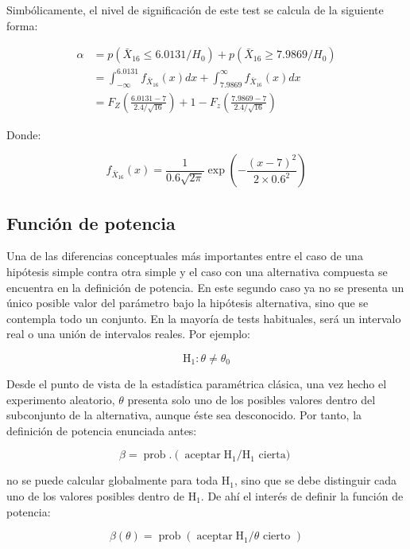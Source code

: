 \documentclass[
]{article}
\begin{document}
Simbólicamente, el nivel de significación de este test se calcula de la siguiente forma:

\[
\begin{aligned}
\alpha & =p\left(\bar{X}_{16} \leq 6.0131 / H_{0}\right)+p\left(\bar{X}_{16} \geq 7.9869 / H_{0}\right) \\
& =\int_{-\infty}^{6.0131} f_{\bar{X}_{16}}(x) d x+\int_{7.9869}^{\infty} f_{\bar{X}_{16}}(x) d x \\
& =F_{Z}\left(\frac{6.0131-7}{2.4 / \sqrt{16}}\right)+1-F_{z}\left(\frac{7.9869-7}{2.4 / \sqrt{16}}\right)
\end{aligned}
\]

Donde:

\[
f_{\bar{X}_{16}}(x)=\frac{1}{0.6 \sqrt{2 \pi}} \exp \left(-\frac{(x-7)^{2}}{2 \times 0.6^{2}}\right)
\]

\subsection{Función de potencia}\label{funciuxf3n-de-potencia}

Una de las diferencias conceptuales más importantes entre el caso de una hipótesis simple contra otra simple y el caso con una alternativa compuesta se encuentra en la definición de potencia. En este segundo caso ya no se presenta un único posible valor del parámetro bajo la hipótesis alternativa, sino que se contempla todo un conjunto. En la mayoría de tests habituales, será un intervalo real o una unión de intervalos reales. Por ejemplo:

\[
\mathrm{H}_{1}: \theta \neq \theta_{0}
\]

Desde el punto de vista de la estadística paramétrica clásica, una vez hecho el experimento aleatorio, \(\theta\) presenta solo uno de los posibles valores dentro del subconjunto de la alternativa, aunque éste sea desconocido. Por tanto, la definición de potencia enunciada antes:

\[
\beta=\operatorname{prob} .\left(\operatorname{aceptar} \mathrm{H}_{1} / \mathrm{H}_{1}\right. \text { cierta) }
\]

no se puede calcular globalmente para toda \(\mathrm{H}_{1}\), sino que se debe distinguir cada uno de los valores posibles dentro de \(\mathrm{H}_{1}\). De ahí el interés de definir la función de potencia:

\[
\beta(\theta)=\operatorname{prob}\left(\operatorname{aceptar} \mathrm{H}_{1} / \theta \text { cierto }\right)
\]
\end{document}
